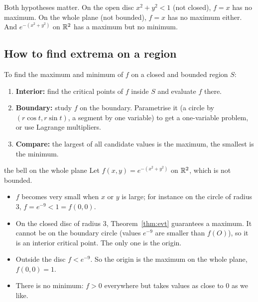 
\begin{trap}
Both hypotheses matter. On the open disc $x^2+y^2<1$ (not closed), $f=x$ has no maximum. On the
whole plane (not bounded), $f=x$ has no maximum either. And $e^{-(x^2+y^2)}$ on $\mathbb{R}^2$ has a
maximum but no minimum.
\end{trap}

\subsection{How to find extrema on a region}

\begin{recipe}
To find the maximum and minimum of $f$ on a closed and bounded region $S$:
\begin{enumerate}
  \item \textbf{Interior:} find the critical points of $f$ inside $S$ and evaluate $f$ there.
  \item \textbf{Boundary:} study $f$ on the boundary. Parametrise it (a circle by
  $(r\cos t,r\sin t)$, a segment by one variable) to get a one-variable problem, or use
  Lagrange multipliers.
  \item \textbf{Compare:} the largest of all candidate values is the maximum, the smallest is
  the minimum.
\end{enumerate}
\end{recipe}

\begin{example}{the bell on the whole plane}
Let $f(x,y)=e^{-(x^2+y^2)}$ on $\mathbb{R}^2$, which is not bounded.
\begin{itemize}
  \item $f$ becomes very small when $x$ or $y$ is large; for instance on the circle of radius
  $3$, $f=e^{-9}<1=f(0,0)$.
  \item On the closed disc of radius $3$, Theorem~\ref{thm:evt} guarantees a maximum. It cannot be
  on the boundary circle (values $e^{-9}$ are smaller than $f(O)$), so it is an interior critical
  point. The only one is the origin.
  \item Outside the disc $f<e^{-9}$. So the origin is the maximum on the whole plane, $f(0,0)=1$.
  \item There is no minimum: $f>0$ everywhere but takes values as close to $0$ as we like.
\end{itemize}
\end{example}

